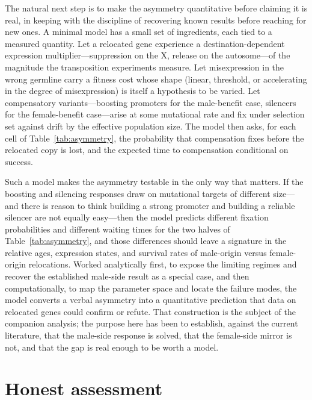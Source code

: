 \documentclass[11pt,a4paper]{article}
\begin{document}
The natural next step is to make the asymmetry quantitative before claiming it is real, in keeping with the discipline of recovering known results before reaching for new ones. A minimal model has a small set of ingredients, each tied to a measured quantity. Let a relocated gene experience a destination-dependent expression multiplier---suppression on the X, release on the autosome---of the magnitude the transposition experiments measure. Let misexpression in the wrong germline carry a fitness cost whose shape (linear, threshold, or accelerating in the degree of misexpression) is itself a hypothesis to be varied. Let compensatory variants---boosting promoters for the male-benefit case, silencers for the female-benefit case---arise at some mutational rate and fix under selection set against drift by the effective population size. The model then asks, for each cell of Table~\ref{tab:asymmetry}, the probability that compensation fixes before the relocated copy is lost, and the expected time to compensation conditional on success.

Such a model makes the asymmetry testable in the only way that matters. If the boosting and silencing responses draw on mutational targets of different size---and there is reason to think building a strong promoter and building a reliable silencer are not equally easy---then the model predicts different fixation probabilities and different waiting times for the two halves of Table~\ref{tab:asymmetry}, and those differences should leave a signature in the relative ages, expression states, and survival rates of male-origin versus female-origin relocations. Worked analytically first, to expose the limiting regimes and recover the established male-side result as a special case, and then computationally, to map the parameter space and locate the failure modes, the model converts a verbal asymmetry into a quantitative prediction that data on relocated genes could confirm or refute. That construction is the subject of the companion analysis; the purpose here has been to establish, against the current literature, that the male-side response is solved, that the female-side mirror is not, and that the gap is real enough to be worth a model.

\section{Honest assessment}
\end{document}
